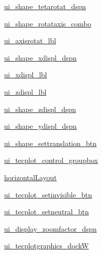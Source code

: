 \begin{DoxyCompactItemize}
\item 
\hyperlink{classoutput__viewer_u_i_1_1_ui___main_window_aa28c70006d121bac80ae12022d751fd9}{ui\+\_\+shape\+\_\+tetarotat\+\_\+dspn}
\item 
\hyperlink{classoutput__viewer_u_i_1_1_ui___main_window_ab8782732fd9dcbabe62718d4fd1eb451}{ui\+\_\+shape\+\_\+rotataxis\+\_\+combo}
\item 
\hyperlink{classoutput__viewer_u_i_1_1_ui___main_window_a9f2714b1287e94beaec813c4859a76ed}{ui\+\_\+axisrotat\+\_\+lbl}
\item 
\hyperlink{classoutput__viewer_u_i_1_1_ui___main_window_a9a614d93a0e921aa5e8e2692269ea93e}{ui\+\_\+shape\+\_\+xdispl\+\_\+dspn}
\item 
\hyperlink{classoutput__viewer_u_i_1_1_ui___main_window_a365b7f614170273dffc60d90f68e7b50}{ui\+\_\+xdispl\+\_\+lbl}
\item 
\hyperlink{classoutput__viewer_u_i_1_1_ui___main_window_a6393abac6ef3d14dd99f90c2038ce668}{ui\+\_\+zdispl\+\_\+lbl}
\item 
\hyperlink{classoutput__viewer_u_i_1_1_ui___main_window_ac2513163c4489ee11aa128f248ac25bc}{ui\+\_\+shape\+\_\+zdispl\+\_\+dspn}
\item 
\hyperlink{classoutput__viewer_u_i_1_1_ui___main_window_a6d782a6f55b193b51dbc457441b6bb6b}{ui\+\_\+shape\+\_\+ydispl\+\_\+dspn}
\item 
\hyperlink{classoutput__viewer_u_i_1_1_ui___main_window_a7463f5748bcd87fed9c7aa83d70d7b4c}{ui\+\_\+shape\+\_\+settranslation\+\_\+btn}
\item 
\hyperlink{classoutput__viewer_u_i_1_1_ui___main_window_a1ed7a735f4879c9335af120f50f99554}{ui\+\_\+tecplot\+\_\+control\+\_\+groupbox}
\item 
\hyperlink{classoutput__viewer_u_i_1_1_ui___main_window_ae4ccda1baa67cbf1b90aeaf28c792f52}{horizontal\+Layout}
\item 
\hyperlink{classoutput__viewer_u_i_1_1_ui___main_window_a7efc66f5379a990bb2d613efad8af792}{ui\+\_\+tecplot\+\_\+setinvisible\+\_\+btn}
\item 
\hyperlink{classoutput__viewer_u_i_1_1_ui___main_window_a7a5d64ed74f4a2a389cfbd88660084ea}{ui\+\_\+tecplot\+\_\+setneutral\+\_\+btn}
\item 
\hyperlink{classoutput__viewer_u_i_1_1_ui___main_window_aab2a02b2ad9ef412370fa6ce21aba778}{ui\+\_\+display\+\_\+zoomfactor\+\_\+dspn}
\item 
\hyperlink{classoutput__viewer_u_i_1_1_ui___main_window_a6ac6813ef0dc08cb729b515d9edfd656}{ui\+\_\+tecplotgraphics\+\_\+dockW}

\end{DoxyCompactItemize}

